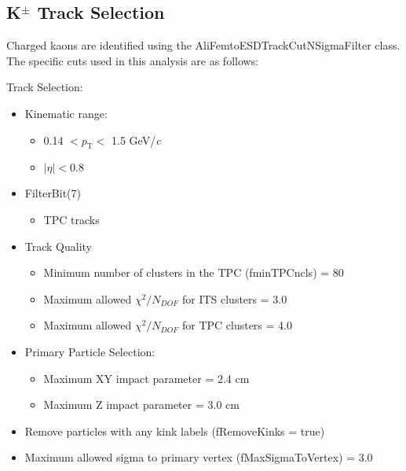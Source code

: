 \documentclass[/home/jesse/Analysis/FemtoAnalysis/AnalysisNotes/AnalysisNoteJBuxton.tex]{subfiles}
\begin{document}
\subsection{\texorpdfstring{K$^{\pm}$}{TEXT} Track Selection}
\label{KchTrackSelection}

Charged kaons are identified using the AliFemtoESDTrackCutNSigmaFilter class.  The specific cuts used in this analysis are as follows:

 Track Selection:
 \begin{itemize}
  \itemsep0em
  \item Kinematic range:
  \begin{itemize}
   \itemsep0em
   \item 0.14 $< p_{\mathrm{T}} <$ 1.5 GeV/\textit{c}
   \item $|\eta| < 0.8$
  \end{itemize}
  \item FilterBit(7)
  \begin{itemize}
   \item TPC tracks
  \end{itemize}
  \item Track Quality
  \begin{itemize}
   \item Minimum number of clusters in the TPC (fminTPCncls) = 80
   \item Maximum allowed $\chi^{2}/N_{DOF}$ for ITS clusters = 3.0
   \item Maximum allowed $\chi^{2}/N_{DOF}$ for TPC clusters = 4.0 
  \end{itemize}
  \item Primary Particle Selection:
  \begin{itemize} 
   \item Maximum XY impact parameter = 2.4 cm
   \item Maximum Z impact parameter = 3.0 cm
  \end{itemize} 
  \item Remove particles with any kink labels (fRemoveKinks = true)
  \item Maximum allowed sigma to primary vertex (fMaxSigmaToVertex) = 3.0
 \end{itemize} 
 
\end{document}

